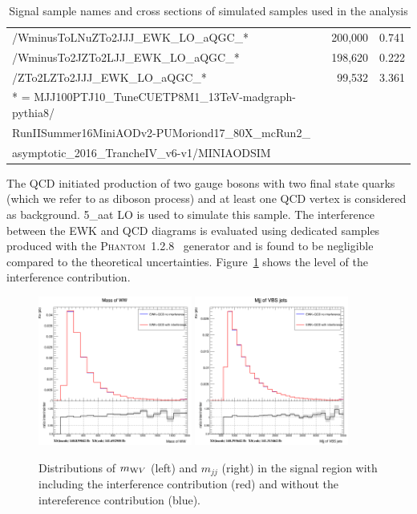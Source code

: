 \begin{table}[!htbp]
\begin{tabular}{lrr}
/WminusToLNuZTo2JJJ\_{}EWK\_{}LO\_{}aQGC\_{}*   & 200,000   & 0.741\\
/WminusTo2JZTo2LJJ\_{}EWK\_{}LO\_{}aQGC\_{}*    & 198,620   & 0.222\\
/ZTo2LZTo2JJJ\_{}EWK\_{}LO\_{}aQGC\_{}*     & 99,532    & 3.361\\
\hline
* = MJJ100PTJ10\_{}TuneCUETP8M1\_{}13TeV-madgraph-pythia8/ \\
    RunIISummer16MiniAODv2-PUMoriond17\_{}80X\_{}mcRun2\_{}\\
    asymptotic\_{}2016\_{}TrancheIV\_{}v6-v1/MINIAODSIM\\
\hline
\end{tabular}
\caption{Signal sample names and cross sections of simulated samples used in the analysis}
\label{tab:signalSamples}
\end{table}
%
The QCD initiated production of two gauge bosons with two final state quarks (which we refer to as diboson process) and at least one QCD vertex is considered as background. \MADGRAPH{}5\_a\MCATNLO at LO is used to simulate this sample. The interference between the EWK and QCD diagrams is evaluated using dedicated samples produced with the \textsc{Phantom}~1.2.8~\cite{Ballestrero:2007xq} generator and is found to be negligible compared to the theoretical uncertainties. Figure~\ref{fig:interference} shows the level of the interference contribution. 

\begin{figure}[!htbp]
\centering
\includegraphics[width=0.45\textwidth]{Plots/plots/interference_comparison_mww.png}
\includegraphics[width=0.45\textwidth]{Plots/plots/interference_comparison_mjj_vbs.png}
\caption{Distributions of $m_{\mathrm{W} V}$ (left) and $m_{jj}$ (right) in the signal region with including the interference contribution (red) and without the intereference contribution (blue).}
\label{fig:interference}
\end{figure}

